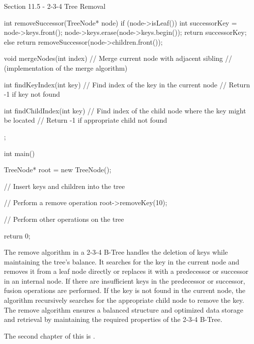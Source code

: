 \begin{notes}{Section 11.5 - 2-3-4 Tree Removal}
\begin{highlight}
\begin{code}[C++]
{            int removeSuccessor(TreeNode* node) {
                if (node->isLeaf()) {
                    int successorKey = node->keys.front();
                    node->keys.erase(node->keys.begin());
                    return successorKey;
                } else {
                    return removeSuccessor(node->children.front());
                }
            }
        
            void mergeNodes(int index) {
                // Merge current node with adjacent sibling
                // (implementation of the merge algorithm)
            }
        
            int findKeyIndex(int key) {
                // Find index of the key in the current node
                // Return -1 if key not found
            }
        
            int findChildIndex(int key) {
                // Find index of the child node where the key might be located
                // Return -1 if appropriate child not found
            }
        };
        
        int main() {
            TreeNode* root = new TreeNode();
        
            // Insert keys and children into the tree
        
            // Perform a remove operation
            root->removeKey(10);
        
            // Perform other operations on the tree
        
            return 0;
        }        
        \end{code}
        The remove algorithm in a 2-3-4 B-Tree handles the deletion of keys while maintaining the tree's balance. It searches for the key in the current node and removes it from a leaf node directly or replaces it with a predecessor or successor in an internal node. If there are insufficient keys in the predecessor or successor, fusion 
        operations are performed. If the key is not found in the current node, the algorithm recursively searches for the appropriate child node to remove the key. The remove algorithm ensures a balanced structure and optimized data storage and retrieval by maintaining the required properties of the 2-3-4 B-Tree.
    \end{highlight}
\end{notes}

The second chapter of this is .

